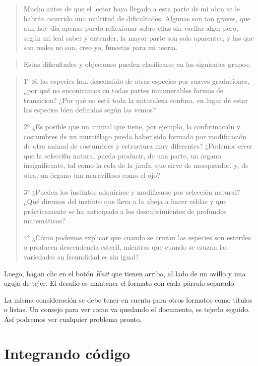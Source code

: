 \documentclass[]{book}
\theoremstyle{definition}
\theoremstyle{definition}
\theoremstyle{definition}
\theoremstyle{remark}
\begin{document}
\begin{quote}
Mucho antes de que el lector haya llegado a esta parte de mi obra se le
habrán ocurrido una multitud de dificultades. Algunas son tan graves,
que aun hoy dia apenas puedo reflexionar sobre ellas sin vacilar algo;
pero, según mi leal saber y entender, la mayor parte son solo aparentes,
y las que son reales no son, creo yo, funestas para mi teoria.
\end{quote}

\begin{quote}
Estas dificultades y objeciones pueden clasificarse en los siguientes
grupos:
\end{quote}

\begin{quote}
1° Si las especies han descendido de otras especies por suaves
gradaciones, ¿por qué no encontramos en todas partes innumerables formas
de transicion? ¿Por qué no está toda la naturaleza confusa, en lugar de
estar las especies bien definidas según las vemos?

2° ¿Es posible que un animal que tiene, por ejemplo, la conformación y
costumbres de un murciélago pueda haber sido formado por modificación de
otro animal de costumbres y estructura muy diferentes? ¿Podemos creer
que la selecci6n natural pueda producir, de una parte, un órgano
insignificante, tal como la cola de la jirafa, que sirve de mosqueador,
y, de otra, un órgano tan maravilloso como el ojo?

3° ¿Pueden los instintos adquirirse y modificarse por selección natural?
¿Qué diremos del instinto que lleva a la abeja a hacer celdas y que
prácticamente se ha anticipado a los descubrimientos de profundos
matemáticos?

4° ¿Cómo podemos explicar que cuando se cruzan las especies son
esteriles o producen descendencia esteril, mientras que cuando se cruzan
las variedades su fecundidad es sin igual?
\end{quote}

Luego, hagan clic en el botón \emph{Knit} que tienen arriba, al lado de
un ovillo y una aguja de tejer. El desafío es mantener el formato con
cada párrafo separado.

La misma consideración se debe tener en cuenta para otros formatos como
títulos o listas. Un consejo para ver como va quedando el documento, es
tejerlo seguido. Así podremos ver cualquier problema pronto.

\hypertarget{integrando-codigo}{%
\section{Integrando código}\label{integrando-codigo}}
\end{document}
